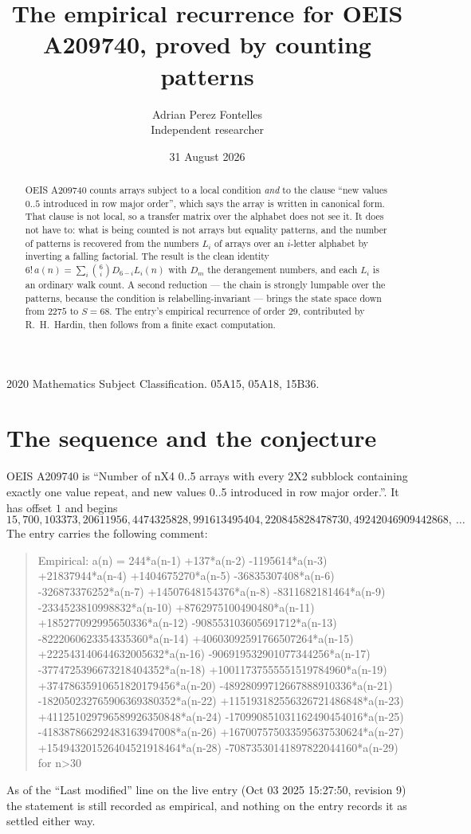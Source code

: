 \documentclass[11pt,a4paper]{article}
\title{The empirical recurrence for OEIS A209740, proved by counting patterns}
\author{Adrian Perez Fontelles\\ \small Independent researcher}
\date{31 August 2026}
\theoremstyle{plain}
\theoremstyle{definition}
\begin{document}
\maketitle

\begin{abstract}
OEIS A209740 counts arrays subject to a local condition \emph{and} to the clause ``new values
$0..5$ introduced in row major order'', which says the array is written in canonical
form. That clause is not local, so a transfer matrix over the alphabet does not see it. It
does not have to: what is being counted is not arrays but equality patterns, and the number
of patterns is recovered from the numbers $L_i$ of arrays over an $i$-letter alphabet by
inverting a falling factorial. The result is the clean identity
$6!\,a(n)=\sum_i\binom{6}{i}D_{6-i}L_i(n)$ with $D_m$ the derangement numbers,
and each $L_i$ is an ordinary walk count. A second reduction --- the chain is strongly
lumpable over the patterns, because the condition is relabelling-invariant --- brings the
state space down from $2275$ to $S=68$. The entry's empirical recurrence of order
$29$, contributed by R.~H.~Hardin, then follows from a finite exact computation.
\end{abstract}

\noindent\small 2020 Mathematics Subject Classification. 05A15, 05A18, 15B36.\normalsize

\section{The sequence and the conjecture}

OEIS A209740 is ``Number of nX4 0..5 arrays with every 2X2 subblock containing exactly one value repeat, and new values 0..5 introduced in row major order.''. It has offset $1$ and begins
\[
15, 700, 103373, 20611956, 4474325828, 991613495404, 220845828478730, 49242046909442868,\ \dots
\]
The entry carries the following comment:
\begin{quote}\small
Empirical: a(n) = 244*a(n-1) +137*a(n-2) -1195614*a(n-3) +21837944*a(n-4) +1404675270*a(n-5) -36835307408*a(n-6) -326873376252*a(n-7) +14507648154376*a(n-8) -8311682181464*a(n-9) -2334523810998832*a(n-10) +8762975100490480*a(n-11) +185277092995650336*a(n-12) -908553103605691712*a(n-13) -8222060623354335360*a(n-14) +40603092591766507264*a(n-15) +222543140644632005632*a(n-16) -906919532901077344256*a(n-17) -3774725396673218404352*a(n-18) +10011737555551519784960*a(n-19) +37478635910651820179456*a(n-20) -48928099712667888910336*a(n-21) -182050232765906369380352*a(n-22) +115193182556326721486848*a(n-23) +411251029796589926350848*a(n-24) -170990851031162490454016*a(n-25) -418387866292483163947008*a(n-26) +167007575033595637530624*a(n-27) +154943201526404521918464*a(n-28) -70873530141897822044160*a(n-29) for n>30
\end{quote}
As of the ``Last modified'' line on the live entry (Oct 03 2025 15:27:50, revision 9) the statement is
still recorded as empirical, and nothing on the entry records it as settled either way.
\end{document}
